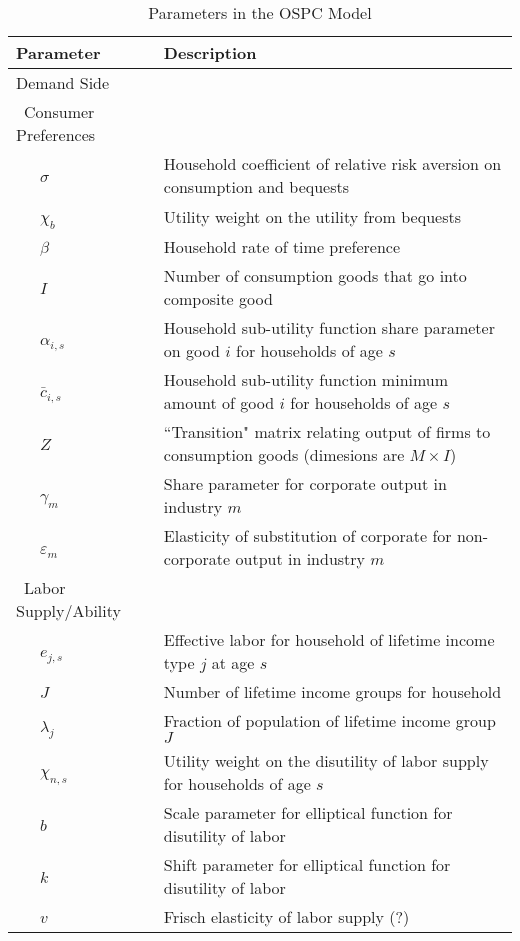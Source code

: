 \documentclass[letterpaper,12pt]{article}
\theoremstyle{definition}
\begin{document}
\begin{table}[h!]
  \centering
  \tiny
  \caption{Parameters in the OSPC Model}
    \begin{tabular}{ll}
    \hline
    \hline
    Parameter & Description \\
    \hline
    Demand Side &  \\
    \ Consumer Preferences &  \\
    \ \ \ $\sigma$ & Household coefficient of relative risk aversion on consumption and bequests \\
    \ \ \ $\chi_{b}$ & Utility weight on the utility from bequests \\
    \ \ \ $\beta$ & Household rate of time preference \\
    \ \ \ $I$ & Number of consumption goods that go into composite good \\
    \ \ \ $\alpha_{i,s}$ & Household sub-utility function share parameter on good $i$ for households of age $s$ \\
    \ \ \ $\bar{c}_{i,s}$ & Household sub-utility function minimum amount of good $i$ for households of age $s$ \\
    \ \ \ $Z$ & ``Transition" matrix relating output of firms to consumption goods (dimesions are $M\times I$) \\
    \ \ \ $\gamma_{m}$ & Share parameter for corporate output in industry $m$ \\
    \ \ \ $\varepsilon_{m}$ & Elasticity of substitution of corporate for non-corporate output in industry $m$ \\
    \ Labor Supply/Ability &  \\
    \ \ \ $e_{j,s}$ & Effective labor for household of lifetime income type $j$ at age $s$ \\
    \ \ \ $J$ & Number of lifetime income groups for household \\
    \ \ \ $\lambda_{j}$ & Fraction of population of lifetime income group $J$ \\
    \ \ \ $\chi_{n,s}$ & Utility weight on the disutility of labor supply for households of age $s$ \\
    \ \ \ $b$ & Scale parameter for elliptical function for disutility of labor \\
    \ \ \ $k$ & Shift parameter for elliptical function for disutility of labor \\
    \ \ \ $v$ & Frisch elasticity of labor supply (?) \\

\end{tabular}
\end{table}
\end{document}
